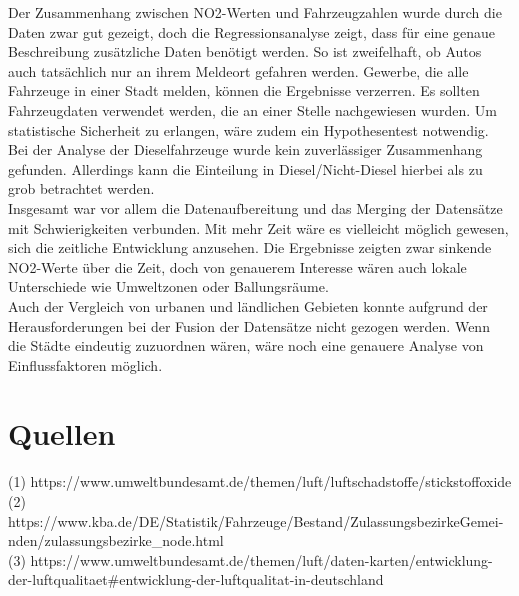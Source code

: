 \documentclass[11pt,a4paper,oneside,german]{article}
\begin{document}
	Der Zusammenhang zwischen NO2-Werten und Fahrzeugzahlen wurde durch die Daten zwar gut gezeigt, doch die Regressionsanalyse zeigt, dass für eine genaue Beschreibung zusätzliche Daten benötigt werden. So ist zweifelhaft, ob Autos auch tatsächlich nur an ihrem Meldeort gefahren werden. Gewerbe, die alle Fahrzeuge in einer Stadt melden, können die Ergebnisse verzerren. Es sollten Fahrzeugdaten verwendet werden, die an einer Stelle nachgewiesen wurden. Um statistische Sicherheit zu erlangen, wäre zudem ein Hypothesentest notwendig. \\
	Bei der Analyse der Dieselfahrzeuge wurde kein zuverlässiger Zusammenhang gefunden. Allerdings kann die Einteilung in Diesel/Nicht-Diesel hierbei als zu grob betrachtet werden. \\
	Insgesamt war vor allem die Datenaufbereitung und das Merging der Datensätze mit Schwierigkeiten verbunden. Mit mehr Zeit wäre es vielleicht möglich gewesen, sich die zeitliche Entwicklung anzusehen. Die Ergebnisse zeigten zwar sinkende NO2-Werte über die Zeit, doch von genauerem Interesse wären auch lokale Unterschiede wie Umweltzonen oder Ballungsräume. \\
	Auch der Vergleich von urbanen und ländlichen Gebieten konnte aufgrund der Herausforderungen bei der Fusion der Datensätze nicht gezogen werden. Wenn die Städte eindeutig zuzuordnen wären, wäre noch eine genauere Analyse von Einflussfaktoren möglich. \\
	
	\section{Quellen}
	
	(1) https://www.umweltbundesamt.de/themen/luft/luftschadstoffe/stickstoffoxide\\
	(2) https://www.kba.de/DE/Statistik/Fahrzeuge/Bestand/ZulassungsbezirkeGemei-nden/zulassungsbezirke\_node.html\\
	(3) https://www.umweltbundesamt.de/themen/luft/daten-karten/entwicklung-der-luftqualitaet\#entwicklung-der-luftqualitat-in-deutschland
	
	
	
\end{document}
